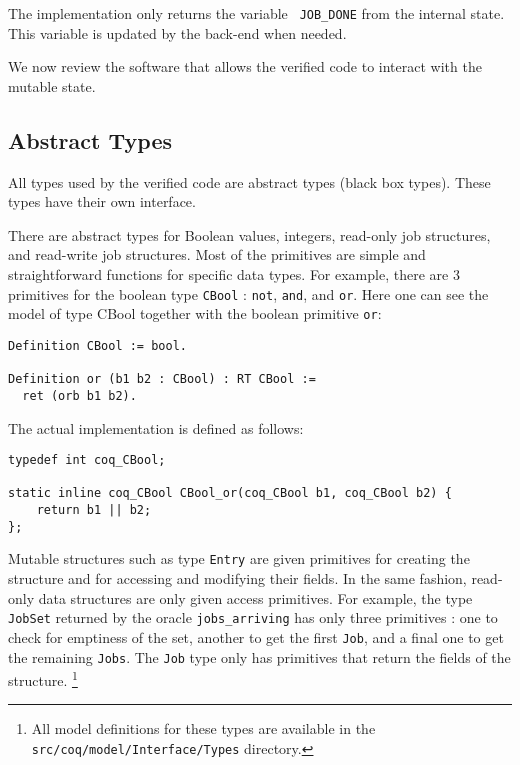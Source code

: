 	The implementation only returns the variable \texttt{ JOB\_DONE} from the internal state. This variable is updated by the back-end when needed.

	We now review the software that allows the verified code to interact with the mutable state.

	\subsection{Abstract Types}

	All types used by the verified code are abstract types (black box types). These types have their own interface. 

	There are abstract types for Boolean values, integers, read-only job structures, and read-write job structures. Most of the primitives are simple and straightforward functions for specific data types. For example, there are 3 primitives for the boolean type \texttt{CBool} : \texttt{not}, \texttt{and}, and \texttt{or}.
	Here one can see the model of type CBool together with the boolean primitive \texttt{or}:

	\begin{verbatim}
Definition CBool := bool.

Definition or (b1 b2 : CBool) : RT CBool :=
  ret (orb b1 b2).
	\end{verbatim}

	The actual implementation is defined as follows:

	\begin{verbatim}
typedef int coq_CBool;

static inline coq_CBool CBool_or(coq_CBool b1, coq_CBool b2) {
    return b1 || b2;
};
	\end{verbatim}

	Mutable structures such as type \texttt{Entry} are given primitives for creating the structure and for accessing and modifying their fields. In the same fashion, read-only data structures are only given access primitives. For example, the type \texttt{JobSet} returned by the oracle \texttt{jobs\_arriving} has only three primitives : one to check for emptiness of the set, another to get the first \texttt{Job}, and a final one to get the remaining \texttt{Jobs}. The \texttt{Job} type only has primitives that return the fields of the structure. \footnote{All model definitions for these types are available in the \texttt{src/coq/model/Interface/Types} directory.}


